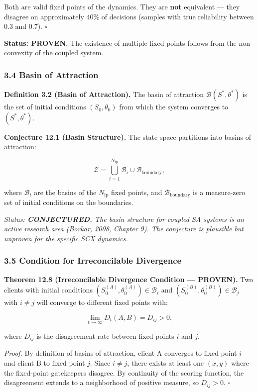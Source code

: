 \documentclass[
  12pt,
]{article}
\begin{document}
Both are valid fixed points of the dynamics. They are \textbf{not}
equivalent --- they disagree on approximately 40\% of decisions (samples
with true reliability between 0.3 and 0.7). \(\square\)

\textbf{Status: PROVEN.} The existence of multiple fixed points follows
from the non-convexity of the coupled system.

\subsubsection{3.4 Basin of Attraction}\label{basin-of-attraction}

\textbf{Definition 3.2 (Basin of Attraction).} The basin of attraction
\(\mathcal{B}(S^*, \theta^*)\) is the set of initial conditions
\((S_0, \theta_0)\) from which the system converges to
\((S^*, \theta^*)\).

\textbf{Conjecture 12.1 (Basin Structure).} The state space partitions
into basins of attraction:

\[\mathcal{Z} = \bigcup_{i=1}^{N_{\text{fp}}} \mathcal{B}_i \cup \mathcal{B}_{\text{boundary}},\]

where \(\mathcal{B}_i\) are the basins of the \(N_{\text{fp}}\) fixed
points, and \(\mathcal{B}_{\text{boundary}}\) is a measure-zero set of
initial conditions on the boundaries.

\emph{Status: \textbf{CONJECTURED.} The basin structure for coupled SA
systems is an active research area (Borkar, 2008, Chapter 9). The
conjecture is plausible but unproven for the specific SCX dynamics.}

\subsubsection{3.5 Condition for Irreconcilable
Divergence}\label{condition-for-irreconcilable-divergence}

\textbf{Theorem 12.8 (Irreconcilable Divergence Condition --- PROVEN).}
Two clients with initial conditions
\((S_0^{(A)}, \theta_0^{(A)}) \in \mathcal{B}_i\) and
\((S_0^{(B)}, \theta_0^{(B)}) \in \mathcal{B}_j\) with \(i \neq j\) will
converge to different fixed points with:

\[\lim_{t \to \infty} D_t(A, B) = D_{ij} > 0,\]

where \(D_{ij}\) is the disagreement rate between fixed points \(i\) and
\(j\).

\emph{Proof.} By definition of basins of attraction, client A converges
to fixed point \(i\) and client B to fixed point \(j\). Since
\(i \neq j\), there exists at least one \((x,y)\) where the fixed-point
gatekeepers disagree. By continuity of the scoring function, the
disagreement extends to a neighborhood of positive measure, so
\(D_{ij} > 0\). \(\square\)
\end{document}
